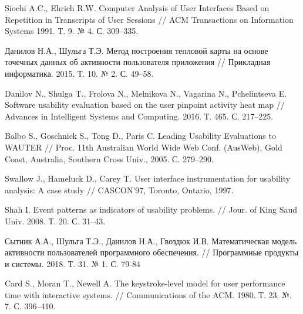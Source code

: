 
\begin{thebibliography}{1}
	Siochi A.C., Ehrich R.W.
	Computer Analysis of User Interfaces Based on Repetition in Transcripts of User Sessions
	// ACM Transactions on Information Systems 1991. Т. 9. № 4. С. 309–335.
	
	Данилов Н.А., Шульга Т.Э.
	Метод построения тепловой карты на основе точечных данных об активности пользователя приложения
	// Прикладная информатика. 2015. Т. 10. № 2. С. 49–58.
	
	Danilov N., Shulga T., Frolova N., Melnikova N., Vagarina N., Pchelintseva E.
	Software usability evaluation based on the user pinpoint activity heat map
	// Advances in Intelligent Systems and Computing. 2016. Т. 465. С. 217–225.
	
	Balbo S., Goschnick S., Tong D., Paris C.
	Leading Usability Evaluations to WAUTER
	// Proc. 11th Australian World Wide Web Conf. (AusWeb), Gold Coast, Australia, Southern Cross Univ., 2005. С. 279–290.
	
	Swallow J., Hameluck D., Carey T.
	User interface instrumentation for usability analysis: A case study
	// CASCON’97, Toronto, Ontario, 1997.
	
	Shah I.
	Event patterns as indicators of usability problems.
	// Jour. of King Saud Univ. 2008. Т. 20. С. 31–43.
	
	Сытник А.А., Шульга Т.Э., Данилов Н.А., Гвоздюк И.В.
	Математическая модель активности пользователей программного обеспечения.
	// Программные продукты и системы. 2018. Т. 31. № 1. С. 79-84 
	
	Card S., Moran T., Newell A.
	The keystroke-level model for user performance time with interactive systems.
	// Communications of the ACM. 1980. Т. 23. №. 7. С. 396–410.
	
\end{thebibliography}

